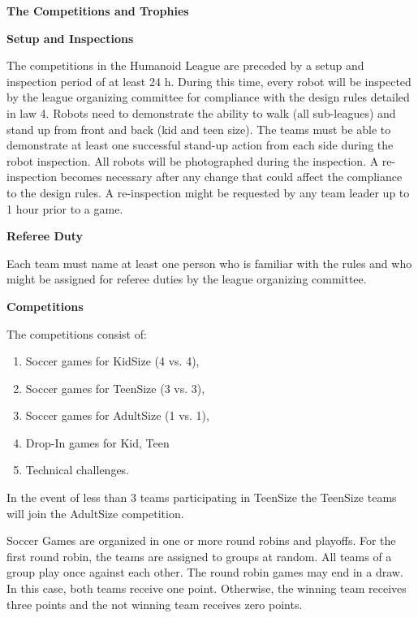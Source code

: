 \clearpage
\sffamily
{\bfseries\color[rgb]{0.4,0.4,0.4}The Competitions and Trophies}

\bigskip

{\bfseries Setup and Inspections}

\headlinebox

The competitions in the Humanoid League are preceded by a setup and inspection period of at least 24 h. During this time, every robot will be inspected by the league organizing committee for compliance with the design rules detailed in law 4. Robots need to demonstrate the ability to walk (all sub-leagues) and stand up from front and back (kid and teen size). The teams must be able to demonstrate at least one successful stand-up action from each side during the robot inspection. All robots will be photographed during the inspection. A re-inspection becomes necessary after any change that could affect the compliance to the design rules. A re-inspection might be requested by any team leader up to 1 hour prior to a game.

\bigskip

{\bfseries Referee Duty}

\headlinebox

Each team must name at least one person who is familiar with the rules and who might be assigned for referee duties by the league organizing committee.

\bigskip

{\bfseries Competitions}

\headlinebox

The competitions consist of:

\begin{enumerate}
\item Soccer games for KidSize (4 vs. 4),
\item Soccer games for TeenSize (3 vs. 3),
\item Soccer games for AdultSize (1 vs. 1),
\item Drop-In games for Kid, Teen 
\item Technical challenges.
\end{enumerate}

\bigskip

In the event of less than 3 teams participating in TeenSize the TeenSize teams will join the AdultSize competition.

\bigskip

Soccer Games are organized in one or more round robins and playoffs. For the first round robin, the teams are assigned to groups at random. All teams of a group play once against each other. The round robin games may end in a draw. In this case, both teams receive one point. Otherwise, the winning team receives three points and the not winning team receives zero points.

